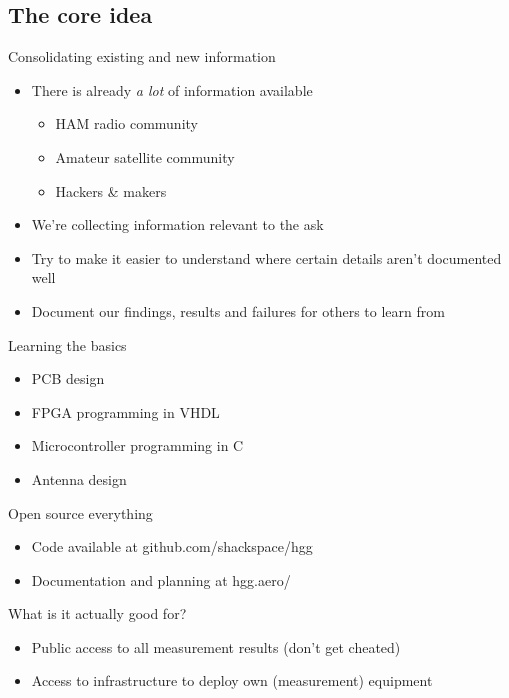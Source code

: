 \subsection{The core idea}
	\begin{frame}{Consolidating existing and new information}
		\begin{itemize}
			\item There is already \emph{a lot} of information available
			\begin{itemize}
				\item HAM radio community
				\item Amateur satellite community
				\item Hackers \& makers
			\end{itemize}
			\item We're collecting information relevant to the ask
			\item Try to make it easier to understand where certain details aren't documented well
			\item Document our findings, results and failures for others to learn from
		\end{itemize}
	\end{frame}

	\begin{frame}{Learning the basics}
		\begin{itemize}
			\item PCB design
			\item FPGA programming in VHDL
			\item Microcontroller programming in C
			\item Antenna design
		\end{itemize}
	\end{frame}

	\begin{frame}{Open source everything}
		\begin{itemize}
			\item Code available at github.com/shackspace/hgg
			\item Documentation and planning at hgg.aero/
		\end{itemize}
	\end{frame}

	\begin{frame}{What is it actually good for?}
		\begin{itemize}
			\item Public access to all measurement results (don't get cheated)
			\item Access to infrastructure to deploy own (measurement) equipment
		\end{itemize}
	\end{frame}

